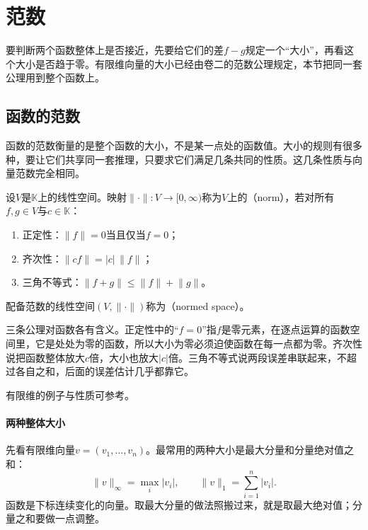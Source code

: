 \section{范数}
\label{sec:nspace-norms}

要判断两个函数整体上是否接近，先要给它们的差$f-g$规定一个“大小”，再看这个大小是否趋于零。有限维向量的大小已经由卷二的范数公理规定，本节把同一套公理用到整个函数上。

\subsection{函数的范数}
\label{sec:nspace-function-norms}

函数的范数衡量的是整个函数的大小，不是某一点处的函数值。大小的规则有很多种，要让它们共享同一套推理，只要求它们满足几条共同的性质。这几条性质与向量范数完全相同。

\begin{definition}[范数与赋范空间]
\label{def:nspace-norm}
设$V$是$\mathbb K$上的线性空间。映射$\lVert\cdot\rVert:V\to[0,\infty)$称为$V$上的（norm），若对所有$f,g\in V$与$c\in\mathbb K$：
\begin{enumerate}
 \item 正定性：$\lVert f\rVert=0$当且仅当$f=0$；
 \item 齐次性：$\lVert cf\rVert=\lvert c\rvert\,\lVert f\rVert$；
 \item 三角不等式：$\lVert f+g\rVert\leq\lVert f\rVert+\lVert g\rVert$。
\end{enumerate}
配备范数的线性空间$(V,\lVert\cdot\rVert)$称为（normed space）。
\end{definition}

三条公理对函数各有含义。正定性中的“$f=0$”指$f$是零元素，在逐点运算的函数空间里，它是处处为零的函数，所以大小为零必须迫使函数在每一点都为零。齐次性说把函数整体放大$c$倍，大小也放大$\lvert c\rvert$倍。三角不等式说两段误差串联起来，不超过各自之和，后面的误差估计几乎都靠它。

有限维的例子与性质可参考。

\paragraph{两种整体大小}
先看有限维向量$v=(v_1,\ldots,v_n)$。最常用的两种大小是最大分量和分量绝对值之和：
\[
 \lVert v\rVert_\infty=\max_i\lvert v_i\rvert,\qquad \lVert v\rVert_1=\sum_{i=1}^n\lvert v_i\rvert.
\]
函数是下标连续变化的向量。取最大分量的做法照搬过来，就是取最大绝对值；分量之和要做一点调整。

